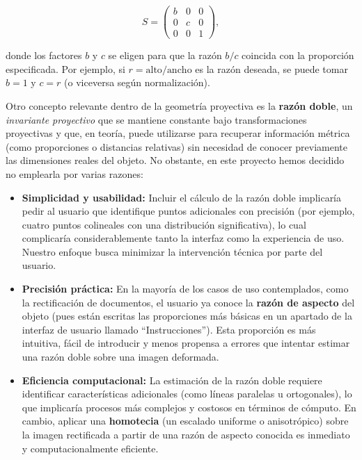 \[
S = 
\begin{pmatrix}
b & 0 & 0 \\
0 & c & 0 \\
0 & 0 & 1
\end{pmatrix},
\]

donde los factores \(b\) y \(c\) se eligen para que la razón \(b/c\) coincida con la proporción especificada. Por ejemplo, si \(r = \text{alto}/\text{ancho}\) es la razón deseada, se puede tomar \(b=1\) y \(c=r\) (o viceversa según normalización).

Otro concepto relevante dentro de la geometría proyectiva es la \textbf{razón doble}, un \textit{invariante proyectivo} que se mantiene constante bajo transformaciones proyectivas y que, en teoría, puede utilizarse para recuperar información métrica (como proporciones o distancias relativas) sin necesidad de conocer previamente las dimensiones reales del objeto. No obstante, en este proyecto hemos decidido no emplearla por varias razones:

\begin{itemize}
    \item \textbf{Simplicidad y usabilidad:} Incluir el cálculo de la razón doble implicaría pedir al usuario que identifique puntos adicionales con precisión (por ejemplo, cuatro puntos colineales con una distribución significativa), lo cual complicaría considerablemente tanto la interfaz como la experiencia de uso. Nuestro enfoque busca minimizar la intervención técnica por parte del usuario.
    
    \item \textbf{Precisión práctica:} En la mayoría de los casos de uso contemplados, como la rectificación de documentos, el usuario ya conoce la \textbf{razón de aspecto} del objeto (pues están escritas las proporciones más básicas en un apartado de la interfaz de usuario llamado ``Instrucciones''). Esta proporción es más intuitiva, fácil de introducir y menos propensa a errores que intentar estimar una razón doble sobre una imagen deformada.
    
    \item \textbf{Eficiencia computacional:} La estimación de la razón doble requiere identificar características adicionales (como líneas paralelas u ortogonales), lo que implicaría procesos más complejos y costosos en términos de cómputo. En cambio, aplicar una \textbf{homotecia} (un escalado uniforme o anisotrópico) sobre la imagen rectificada a partir de una razón de aspecto conocida es inmediato y computacionalmente eficiente.
\end{itemize}

